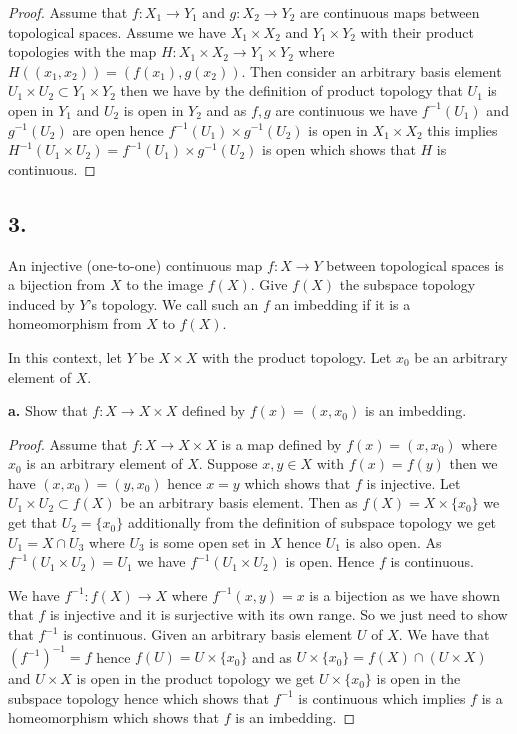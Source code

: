 \documentclass{amsart}
\theoremstyle{plain}
\theoremstyle{definition}
\theoremstyle{remark}
\begin{document}
\begin{proof}
    Assume that $f:X_1 \to Y_1$ and $g: X_2\to Y_2$ are continuous maps between topological spaces. Assume we have $X_1\times X_2$ and $Y_1\times Y_2$ with their product topologies with the map $H: X_1\times X_2 \to Y_1\times Y_2$ where $H((x_1,x_2))=(f(x_1),g(x_2))$. Then consider an arbitrary basis element $U_1\times U_2 \subset Y_1\times Y_2$ then we have by the definition of product topology that $U_1$ is open in $Y_1$ and $U_2$ is open in $Y_2$ and as $f,g$ are continuous we have $f^{-1}(U_1)$ and $g^{-1}(U_2)$ are open hence $f^{-1}(U_1) \times g^{-1}(U_2)$ is open in $X_1\times X_2$ this implies $H^{-1}(U_1\times U_2)=f^{-1}(U_1)\times g^{-1}(U_2)$ is open which shows that $H$ is continuous.
    
\end{proof}




\vspace{.15in}

\noindent
\subsection*{3.} An injective (one-to-one) continuous map $f : X \rightarrow Y$ between topological spaces is a bijection from $X$ to the image $f(X)$. Give $f(X)$ the subspace topology induced by $Y$'s topology.  We call such an $f$ an imbedding if it is a homeomorphism from $X$ to $f(X)$. 

In this context, let $Y$ be $X \times X$ with the product topology. Let $x_0$ be an arbitrary element of $X$. 

 \vspace{.1in}
{\bfseries a.} Show that $f : X \rightarrow X \times X$ defined by $f(x) = (x, x_0 )$ is an imbedding.

\begin{proof}
    Assume that $f:X \to X\times X$ is a map defined by $f(x)=(x,x_0)$ where $x_0$ is an arbitrary element of $X$. Suppose $x,y\in X$ with $f(x)=f(y)$ then we have $(x,x_0)=(y,x_0)$ hence $x=y$ which shows that $f$ is injective. Let $U_1\times U_2 \subset f(X)$ be an arbitrary basis element. Then as $f(X)=X\times \{x_0\}$ we get that $U_2=\{x_0\}$ additionally from the definition of subspace topology we get $U_1=X\cap U_3$ where $U_3$ is some open set in $X$ hence $U_1$ is also open. As $f^{-1}(U_1\times U_2)=U_1$ we have $f^{-1}(U_1\times U_2)$ is open. Hence $f$ is continuous. 

    We have $f^{-1}:f(X)\to X$ where $f^{-1}(x,y)=x$ is a bijection as we have shown that $f$ is injective and it is surjective with its own range. So we just need to show that $f^{-1}$ is continuous. Given an arbitrary basis element $U$ of $X$. We have that $(f^{-1})^{-1}=f$ hence $f(U)=U\times\{x_0\}$ and as $U\times \{x_0\}=f(X)\cap (U\times X)$ and $U\times X$ is open in the product topology we get $U\times \{x_0\}$ is open in the subspace topology hence which shows that $f^{-1}$ is continuous which implies $f$ is a homeomorphism which shows that $f$ is an imbedding.



    

\end{proof}
\end{document}

